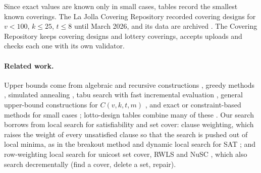 \documentclass[11pt]{article}
\theoremstyle{remark}
\begin{document}
Since exact values are known only in small cases, tables record the smallest known coverings. The La Jolla Covering
Repository recorded covering designs for $v<100$, $k\le 25$, $t\le 8$ until March 2026, and its data are archived
\cite{ljcr}. The Covering Repository \cite{cr} keeps covering designs and lottery coverings, accepts uploads and checks
each one with its own validator.

\paragraph{Related work.} Upper bounds come from algebraic and recursive constructions
\cite{gkp1995,montecalvo2012}, greedy methods \cite{gkp1995}, simulated annealing \cite{nurmela1993}, tabu search with
fast incremental evaluation \cite{fadlaoui2011}, general upper-bound constructions for $C(v,k,t,m)$
\cite{bertolo2004}, and exact or constraint-based methods for small cases
\cite{margot2003,cushing2024}; lotto-design tables combine many of these \cite{livanrees2002}. Our search borrows
from local search for satisfiability and set cover: clause weighting, which raises the weight of every unsatisfied
clause so that the search is pushed out of local minima, as in the breakout method \cite{morris1993} and dynamic local
search for SAT \cite{saps2002}; and row-weighting local search for unicost set cover, RWLS \cite{rwls2015} and NuSC
\cite{nusc2024}, which also search decrementally (find a cover, delete a set, repair).
\end{document}
